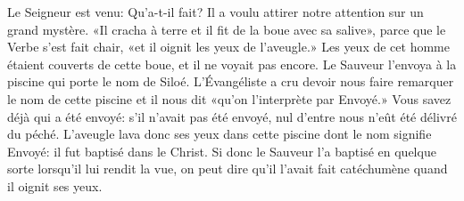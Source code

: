 Le Seigneur est venu: Qu’a-t-il fait?
	Il a voulu attirer notre attention sur un grand mystère.
«Il cracha à terre et il fit de la boue avec sa salive»,
	parce que le Verbe s’est fait chair, «et il oignit les yeux de l’aveugle.»
Les yeux de cet homme étaient couverts de cette boue,
	et il ne voyait pas encore.
Le Sauveur l’envoya à la piscine qui porte le nom de Siloé.
L’Évangéliste a cru devoir nous faire remarquer le nom de cette piscine
	et il nous dit «qu’on l’interprète par Envoyé.»
Vous savez déjà qui a été envoyé:
	s’il n’avait pas été envoyé, nul d’entre nous n’eût été délivré du péché.
L’aveugle lava donc ses yeux dans cette piscine dont le nom signifie Envoyé:
	il fut baptisé dans le Christ.
Si donc le Sauveur l’a baptisé en quelque sorte lorsqu’il lui rendit la vue,
	on peut dire qu’il l’avait fait catéchumène quand il oignit ses yeux.
